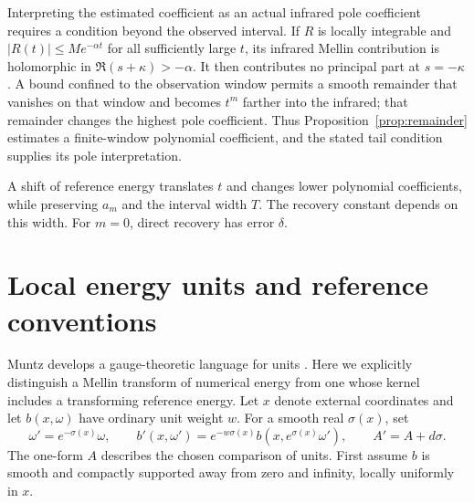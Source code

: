 \documentclass[11pt]{article}
\theoremstyle{remark}\newtheorem{remark}[theorem]{Remark}
\begin{document}
Interpreting the estimated coefficient as an actual infrared pole coefficient requires a condition beyond the observed interval. If $R$ is locally integrable and $|R(t)|\le Me^{-\alpha t}$ for all sufficiently large $t$, its infrared Mellin contribution is holomorphic in $\Re(s+\kappa)>-\alpha$. It then contributes no principal part at $s=-\kappa$. A bound confined to the observation window permits a smooth remainder that vanishes on that window and becomes $t^m$ farther into the infrared; that remainder changes the highest pole coefficient. Thus Proposition~\ref{prop:remainder} estimates a finite-window polynomial coefficient, and the stated tail condition supplies its pole interpretation.

A shift of reference energy translates $t$ and changes lower polynomial coefficients, while preserving $a_m$ and the interval width $T$. The recovery constant depends on this width. For $m=0$, direct recovery has error $\delta$.

\section{Local energy units and reference conventions}\label{sec:units}
Muntz develops a gauge-theoretic language for units \cite{muntz}. Here we explicitly distinguish a Mellin transform of numerical energy from one whose kernel includes a transforming reference energy. Let $x$ denote external coordinates and let $b(x,\omega)$ have ordinary unit weight $w$. For a smooth real $\sigma(x)$, set
\begin{equation}\label{eq:unitlaw}
 \omega'=e^{-\sigma(x)}\omega,\qquad
 b'(x,\omega')=e^{-w\sigma(x)}b(x,e^{\sigma(x)}\omega'),
 \qquad A'=A+d\sigma.
\end{equation}
The one-form $A$ describes the chosen comparison of units. First assume $b$ is smooth and compactly supported away from zero and infinity, locally uniformly in $x$.
\end{document}
